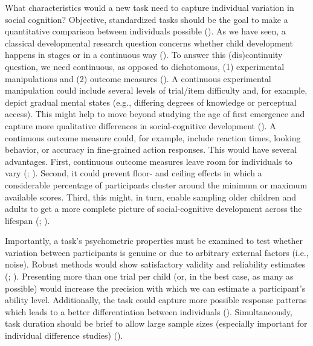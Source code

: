 \documentclass[
]{scrbook}
\begin{document}
What characteristics would a new task need to capture individual variation in social cognition? Objective, standardized tasks should be the goal to make a quantitative comparison between individuals possible (). As we have seen, a classical developmental research question concerns whether child development happens in stages or in a continuous way (). To answer this (dis)continuity question, we need continuous, as opposed to dichotomous, (1) experimental manipulations and (2) outcome measures (). A continuous experimental manipulation could include several levels of trial/item difficulty and, for example, depict gradual mental states (e.g., differing degrees of knowledge or perceptual access). This might help to move beyond studying the age of first emergence and capture more qualitative differences in social-cognitive development (). A continuous outcome measure could, for example, include reaction times, looking behavior, or accuracy in fine-grained action responses. This would have several advantages. First, continuous outcome measures leave room for individuals to vary (; ). Second, it could prevent floor- and ceiling effects in which a considerable percentage of participants cluster around the minimum or maximum available scores. Third, this might, in turn, enable sampling older children and adults to get a more complete picture of social-cognitive development across the lifespan (; ).

Importantly, a task's psychometric properties must be examined to test whether variation between participants is genuine or due to arbitrary external factors (i.e., noise). Robust methods would show satisfactory validity and reliability estimates (; ). Presenting more than one trial per child (or, in the best case, as many as possible) would increase the precision with which we can estimate a participant's ability level. Additionally, the task could capture more possible response patterns which leads to a better differentiation between individuals (). Simultaneously, task duration should be brief to allow large sample sizes (especially important for individual difference studies) ().
\end{document}
